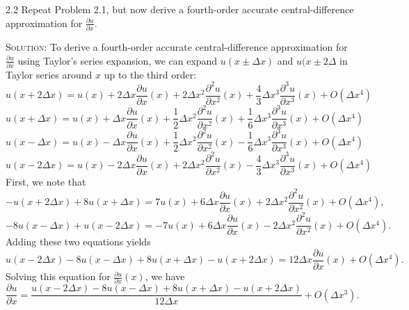 \documentclass{article}
\begin{document}
2.2 Repeat Problem 2.1, but now derive a fourth-order accurate central-difference approximation for $\frac{\partial u}{\partial x}$. 

\textsc{Solution:} To derive a fourth-order accurate central-difference approximation for $\frac{\partial u}{\partial x}$ using Taylor's series expansion, we can expand $u(x \pm \Delta x)$ and $u(x \pm 2 \Delta$ in Taylor series around $x$ up to the third order:
\[
u(x + 2 \Delta x) = u(x) + 2 \Delta x \frac{\partial u}{\partial x}(x) + 2 \Delta x^2 \frac{\partial^2 u}{\partial x^2}(x) + \frac{4}{3} \Delta x^3 \frac{\partial^3 u}{\partial x^3}(x) + O(\Delta x^4)
\]
\[
u(x + \Delta x) = u(x) + \Delta x \frac{\partial u}{\partial x}(x) + \frac{1}{2} \Delta x^2 \frac{\partial^2 u}{\partial x^2}(x) + \frac{1}{6} \Delta x^3 \frac{\partial^3 u}{\partial x^3}(x) + O(\Delta x^4)
\]
\[
u(x - \Delta x) = u(x) - \Delta x \frac{\partial u}{\partial x}(x) + \frac{1}{2} \Delta x^2 \frac{\partial^2 u}{\partial x^2}(x) - \frac{1}{6} \Delta x^3 \frac{\partial^3 u}{\partial x^3}(x) + O(\Delta x^4)
\]
\[
u(x - 2 \Delta x) = u(x) - 2 \Delta x \frac{\partial u}{\partial x}(x) + 2 \Delta x^2 \frac{\partial^2 u}{\partial x^2}(x) - \frac{4}{3} \Delta x^3 \frac{\partial^3 u}{\partial x^3}(x) + O(\Delta x^4)
\]
First, we note that 
\[
-u(x + 2 \Delta x) + 8 u(x + \Delta x) = 7 u(x) + 6 \Delta x \frac{\partial u}{\partial x}(x) + 2 \Delta x^2 \frac{\partial^2 u}{\partial x^2}(x) + O(\Delta x^4),
\]
\[
-8 u(x - \Delta x) + u(x - 2 \Delta x) = -7 u(x) + 6 \Delta x \frac{\partial u}{\partial x}(x) - 2 \Delta x^2 \frac{\partial^2 u}{\partial x^2}(x) + O(\Delta x^4).
\]
Adding these two equations yields 
\[
u(x - 2 \Delta x) - 8 u(x - \Delta x) + 8 u (x + \Delta x) - u(x + 2 \Delta x) = 12 \Delta x \frac{\partial u}{\partial x}(x) + O(\Delta x^4).
\]
Solving this equation for $\frac{\partial u}{\partial x}(x)$, we have
\[
\frac{\partial u}{\partial x} = \frac{u(x - 2 \Delta x) - 8 u(x - \Delta x) + 8 u (x + \Delta x) - u(x + 2 \Delta x)}{12 \Delta x} + O(\Delta x^3).
\]
\end{document}
